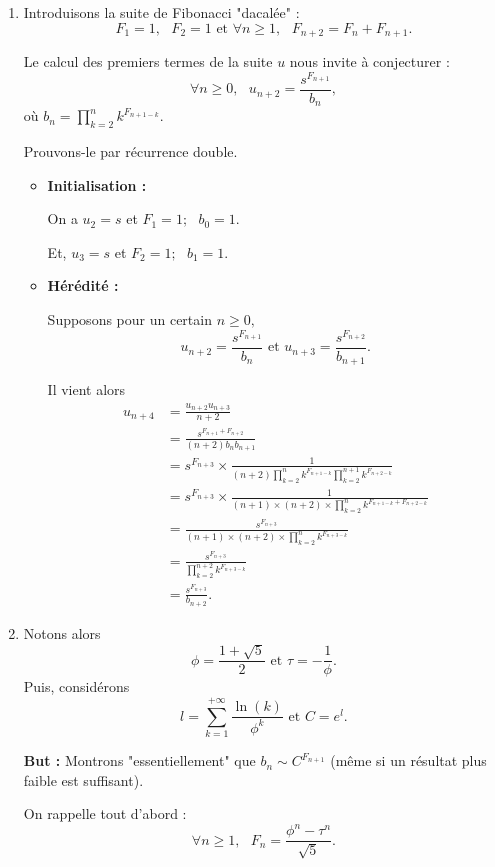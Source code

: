 \begin{enumerate}
\item Introduisons la suite de Fibonacci "dacalée" :
$$F_{1}=1,\mbox { }F_{2}=1 \mbox{ et } \forall n\geq 1,\mbox{ } F_{n+2}=F_{n}+F_{n+1}.$$

Le calcul des premiers termes de la suite $u$ nous invite à conjecturer : $$\forall n\geq 0,\mbox{ } u_{n+2}=\frac{s^{F_{n+1}}}{b_{n}},$$ où $\displaystyle b_{n}=\prod_{k=2}^{n}k^{F_{n+1-k}}.$

Prouvons-le par récurrence double.

\begin{itemize}
 \item \textbf{Initialisation :}

On a $u_{2}=s$ et $F_{1}=1;\mbox{ }b_{0}=1.$

Et, $u_{3}=s$ et $F_{2}=1;\mbox{ }b_{1}=1.$

\item \textbf{Hérédité : }

Supposons pour un certain $n\geq 0,$ $$u_{n+2}=\frac{s^{F_{n+1}}}{b_{n}} \mbox{ et } u_{n+3}=\frac{s^{F_{n+2}}}{b_{n+1}}.$$

Il vient alors 
\begin{align*}
u_{n+4} & =\frac{u_{n+2}u_{n+3}}{n+2}\\
& =\frac{s^{F_{n+1}+F_{n+2}}}{(n+2)b_{n}b_{n+1}}\\
& =s^{F_{n+3}}\times \frac{1}{(n+2)\prod_{k=2}^{n}k^{F_{n+1-k}}\prod_{k=2}^{n+1}k^{F_{n+2-k}}}\\
& = s^{F_{n+3}}\times \frac{1}{(n+1) \times (n+2)\times \prod_{k=2}^{n}k^{F_{n+1-k}+F_{n+2-k}}}\\
& =\frac{s^{F_{n+3}}}{(n+1)\times (n+2)\times \prod_{k=2}^{n}k^{F_{n+3-k}}}\\
& =\frac{s^{F_{n+3}}}{\prod_{k=2}^{n+2}k^{F_{n+3-k}}}\\
& = \frac{s^{F_{n+3}}}{b_{n+2}}.
\end{align*}
\end{itemize}

\item Notons alors $$\phi=\frac{1+\sqrt{5}}{2} \mbox{ et } \tau=-\frac{1}{\phi}.$$
Puis, considérons $$l=\sum_{k=1}^{+\infty}\frac{\ln(k)}{\phi^{k}} \mbox{ et } C=e^{l}.$$

\textbf{But : } Montrons "essentiellement" que $\displaystyle b_{n}\sim C^{F_{n+1}}$ (même si un résultat plus faible est suffisant).

On rappelle tout d'abord : $$\forall n\geq 1,\mbox{ } F_{n}=\frac{\phi^{n}-\tau^{n}}{\sqrt{5}}.$$


\end{enumerate}
